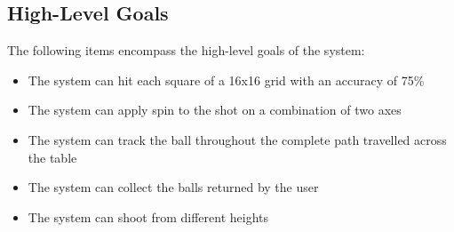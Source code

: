 \documentclass[11pt]{article}
\begin{document}
\subsection{High-Level Goals}
The following items encompass the high-level goals of the system:
\begin{itemize}
\item The system can hit each square of a 16x16 grid with an accuracy of 75\%
\item The system can apply spin to the shot on a combination of two axes
\item The system can track the ball throughout the complete path travelled across the table
\item The system can collect the balls returned by the user
\item The system can shoot from different heights
\end{itemize}
\end{document}
